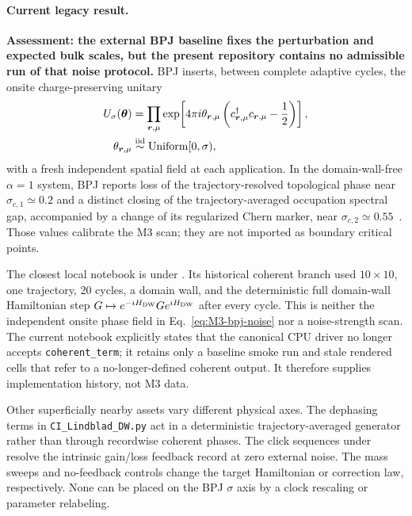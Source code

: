 \documentclass[aps,prx,twocolumn,floatfix,nofootinbib,superscriptaddress,longbibliography]{revtex4-2}
\newcommand{\code}[1]{\texttt{#1}}
\begin{document}
\paragraph*{Current legacy result.}
\textbf{Assessment: the external BPJ baseline fixes the perturbation and expected bulk
scales, but the present repository contains no admissible run of that noise protocol.}
BPJ inserts, between complete adaptive cycles, the onsite charge-preserving unitary
\begin{equation}
 \begin{aligned}
 U_\sigma(\bm\theta)&=
 \prod_{\bm r,\mu}
 \exp\!\left[4\pi i\theta_{\bm r,\mu}
 \left(c^\dagger_{\bm r,\mu}c_{\bm r,\mu}-\frac12\right)\right],\\
 \theta_{\bm r,\mu}&\overset{\mathrm{iid}}{\sim}{\rm Uniform}[0,\sigma),
 \end{aligned}
 \label{eq:M3-bpj-noise}
\end{equation}
with a fresh independent spatial field at each application.  In the domain-wall-free
$\alpha=1$ system, BPJ reports loss of the trajectory-resolved topological phase near
$\sigma_{c,1}\simeq0.2$ and a distinct closing of the trajectory-averaged occupation
spectral gap, accompanied by a change of its regularized Chern marker, near
$\sigma_{c,2}\simeq0.55$~\cite{BhuiyanPanJian2026}.  Those values calibrate the M3 scan;
they are not imported as boundary critical points.

The closest local notebook is under .
Its historical coherent branch used $10\times10$, one trajectory, 20 cycles, a domain wall,
and the deterministic full domain-wall Hamiltonian step
$G\mapsto e^{-iH_{\rm DW}}G e^{iH_{\rm DW}}$ after every cycle.  This is neither the
independent onsite phase field in Eq.~\eqref{eq:M3-bpj-noise} nor a noise-strength scan.
The current notebook explicitly states that the canonical CPU driver no longer accepts
\code{coherent\_term}; it retains only a baseline smoke run and stale rendered cells that
refer to a no-longer-defined coherent output.  It therefore supplies implementation
history, not M3 data.

Other superficially nearby assets vary different physical axes.  The dephasing terms in
\code{CI\_Lindblad\_DW.py} act in a deterministic trajectory-averaged generator rather
than through recordwise coherent phases.  The click sequences under
 resolve the
intrinsic gain/loss feedback record at zero external noise.  The mass sweeps and
no-feedback controls change the target Hamiltonian or correction law, respectively.
None can be placed on the BPJ $\sigma$ axis by a clock rescaling or parameter relabeling.
\end{document}
